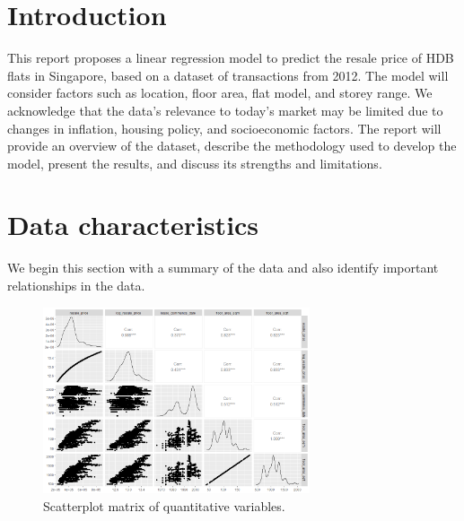 
\usepackage[a4paper, margin=0.3cm]{geometry}
\sectionfont{\normalsize}
\subsectionfont{\normalsize}
\subsubsectionfont{\small}



\maketitle
\pagestyle{empty}

\section{Introduction}

This report proposes a linear regression model to predict the resale price of HDB flats in Singapore, based on a dataset of transactions from 2012. The model will consider factors such as location, floor area, flat model, and storey range. We acknowledge that the data's relevance to today's market may be limited due to changes in inflation, housing policy, and socioeconomic factors. The report will provide an overview of the dataset, describe the methodology used to develop the model, present the results, and discuss its strengths and limitations.

\section{Data characteristics}

We begin this section with a summary of the data and also identify important relationships in the data.

\begin{figure}[!htp]
    \centering
    \includegraphics[width=0.7\textwidth]{images/scatterplotmatrix.png}
    \caption{Scatterplot matrix of quantitative variables.}
    \label{fig:scatterplot matrix}
\end{figure}

